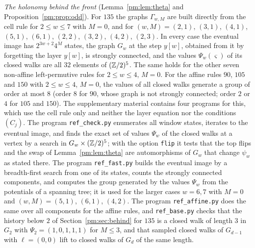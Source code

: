 \emph{The holonomy behind the front} (Lemma~\ref{pm:lem:theta} and Proposition~\ref{pm:prop:odd}). For $135$ the graphs $\Gamma_{w,M}$ are built directly from the cell rule for $2\le w\le7$ with $M=0$, and for $(w,M)=(2,1)$, $(3,1)$, $(4,1)$, $(5,1)$, $(6,1)$, $(2,2)$, $(3,2)$, $(4,2)$, $(2,3)$. In every case the eventual image has $2^{3w+2}4^M$ states, the graph $G_w$ at the step $y[w]$, obtained from it by forgetting the layer $y[w]$, is strongly connected, and the values $\Psi_w(\varsigma)$ of its closed walks are all $32$ elements of $(\mathbb{Z}/2)^5$. The same holds for the other seven non-affine left-permutive rules for $2\le w\le4$, $M=0$. For the affine rules $90$, $105$ and $150$ with $2\le w\le4$, $M=0$, the values of all closed walks generate a group of order at most $8$ (order $8$ for $90$, whose graph is not strongly connected; order $2$ or $4$ for $105$ and $150$). The supplementary material contains four programs for this, which use the cell rule only and neither the layer equation nor the conditions $(C_j)$. The program \texttt{ref\_check.py} enumerates all window states, iterates to the eventual image, and finds the exact set of values $\Psi_w$ of the closed walks at a vertex by a search in $G_w\times(\mathbb{Z}/2)^5$; with the option \texttt{flip} it tests that the top flips and the swap of Lemma~\ref{pm:lem:theta} are automorphisms of $G_w$ that change $\psi_w$ as stated there. The program \texttt{ref\_fast.py} builds the eventual image by a breadth-first search from one of its states, counts the strongly connected components, and computes the group generated by the values $\Psi_w$ from the potentials of a spanning tree; it is used for the larger cases $w=6,7$ with $M=0$ and $(w,M)=(5,1)$, $(6,1)$, $(4,2)$. The program \texttt{ref\_affine.py} does the same over all components for the affine rules, and \texttt{ref\_base.py} checks that the history below $2$ of Section~\ref{pm:sec:behind} for $135$ is a closed walk of length $3$ in $G_2$ with $\Psi_2=(1,0,1,1,1)$ for $M\le3$, and that sampled closed walks of $G_{d-1}$ with $\ell=(0,0)$ lift to closed walks of $G_d$ of the same length.

